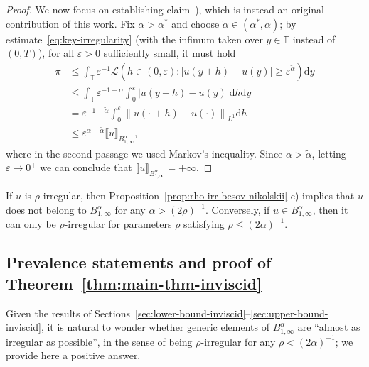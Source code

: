 \documentclass[11pt,oneside,reqno]{amsart}
\newcommand{\mathd}{\mathrm{d}}
\newcommand{\tmtextit}[1]{\text{{\itshape{#1}}}}
\numberwithin{equation}{section}
\begin{document}
\begin{proof}
  We now focus on establishing claim~\tmtextit{c}), which is instead an
  original contribution of this work. Fix $\alpha > \alpha^{\ast}$ and choose
  $\tilde{\alpha} \in (\alpha^{\ast}, \alpha)$; by
  estimate~\eqref{eq:key-irregularity} (with the infimum taken over $y \in
  \mathbb{T}$ instead of $(0, T)$),
  for all $\varepsilon > 0$ sufficiently small, it must hold
%  
  \begin{align*}
    \pi & \leqslant \int_{\mathbb{T}} \varepsilon^{- 1} \mathcal{L} (h \in (0,
    \varepsilon) : | u (y + h) - u (y) | \geqslant
    \varepsilon^{\tilde{\alpha}}) \mathd y\\
    & \leqslant \int_{\mathbb{T}} \varepsilon^{- 1 - \tilde{\alpha}}
    \int_0^{\varepsilon} | u (y + h) - u (y) | \mathd h \mathd y\\
    & = \varepsilon^{- 1 - \tilde{\alpha}} \int_0^{\varepsilon} \left\| u
    \left( \cdot \, + h \right) - u (\cdot) \right\|_{L^1} \mathd h\\
    & \leqslant \varepsilon^{\alpha - \tilde{\alpha}}  \llbracket u
    \rrbracket_{B^{\alpha}_{1, \infty}},
  \end{align*}
%  
  where in the second passage we used Markov's inequality. Since $\alpha >
  \tilde{\alpha}$, letting $\varepsilon \rightarrow 0^+$ we can conclude that
  $\llbracket u \rrbracket_{B^{\alpha}_{1, \infty}} = + \infty$.
\end{proof}

\begin{remark}
  If $u$ is $\rho$-irregular, then
  Proposition~\ref{prop:rho-irr-besov-nikolskii}\mbox{-}c)
  implies that $u$ does not belong to $B^{\alpha}_{1, \infty}$ for any $\alpha
  > (2 \rho)^{- 1}$. Conversely, if $u \in B^{\alpha}_{1, \infty}$, then it
  can only be $\rho$-irregular for parameters $\rho$ satisfying $\rho
  \leqslant (2 \alpha)^{- 1}$.
\end{remark}

\subsection{Prevalence statements and proof of
Theorem~\ref{thm:main-thm-inviscid}}\label{sec:prevalence-mixing}

Given the results of
Sections~\ref{sec:lower-bound-inviscid}--\ref{sec:upper-bound-inviscid}, it is
natural to wonder whether generic elements of $B^{\alpha}_{1, \infty}$ are
``almost as irregular as possible'', in the sense of being $\rho$-irregular
for any $\rho < (2 \alpha)^{- 1}$; we provide here a positive answer.
\end{document}

